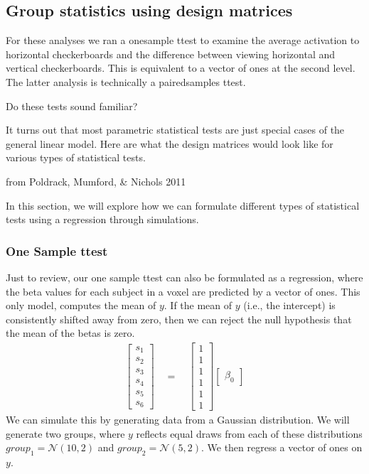 \documentclass[letterpaper,10pt,english]{sphinxmanual}
\begin{document}
\subsection{Group statistics using design matrices}
\label{\detokenize{content/Group_Analysis:group-statistics-using-design-matrices}}
For these analyses we ran a one\sphinxhyphen{}sample t\sphinxhyphen{}test to examine the average activation to horizontal checkerboards and the difference between viewing horizontal and vertical checkerboards. This is equivalent to a vector of ones at the second level. The latter analysis is technically a paired\sphinxhyphen{}samples t\sphinxhyphen{}test.

Do these tests sound familiar?

It turns out that most parametric statistical tests are just special cases of the general linear model.  Here are what the design matrices would look like for various types of statistical tests.

from Poldrack, Mumford, \& Nichols 2011

In this section, we will explore how we can formulate different types of statistical tests using a regression through simulations.


\subsubsection{One Sample t\sphinxhyphen{}test}
\label{\detokenize{content/Group_Analysis:id1}}
Just to review, our one sample t\sphinxhyphen{}test can also be formulated as a regression, where the beta values for each subject in a voxel are predicted by a vector of ones. This  only model, computes the mean of \(y\). If the mean of \(y\) (i.e., the intercept) is consistently shifted away from zero, then we can reject the null hypothesis that the mean of the betas is zero.
\begin{equation*}
\begin{split}
\begin{bmatrix}
s_1 \\
s_2 \\
s_3 \\
s_4 \\
s_5 \\
s_6
\end{bmatrix}
\quad
=
\quad
\begin{bmatrix}
1 \\
1 \\
1 \\
1 \\
1 \\
1
\end{bmatrix}
\begin{bmatrix}
\beta_0 
\end{bmatrix}
\end{split}
\end{equation*}
We can simulate this by generating data from a Gaussian distribution. We will generate two groups, where \(y\) reflects equal draws from each of these distributions \({group_1} = \mathcal{N}(10, 2)\) and \({group_2} = \mathcal{N}(5, 2)\). We then regress a vector of ones on \(y\).
\end{document}
